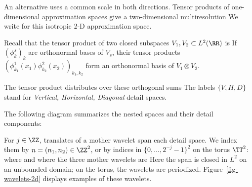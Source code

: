An alternative uses a common scale in both directions. Tensor products of one-dimensional approximation spaces give a two-dimensional multiresolution
We write
for this isotropic 2-D approximation space.

Recall that the tensor product of two closed subspaces $V_1,V_2\subset L^2(\RR)$ is
If $(\phi_k^s)_k$ are orthonormal bases of $V_s$, their tensor products $(\phi_{k_1}^1(x_1)\phi_{k_2}^2(x_2))_{k_1,k_2}$ form an orthonormal basis of $V_1 \otimes V_2$.

The tensor product distributes over these orthogonal sums
The labels $\{V,H,D\}$ stand for \textit{Vertical, Horizontal, Diagonal} detail spaces.
 
The following diagram summarizes the nested spaces and their detail components:
\begin{center}
\end{center}

For $j \in \ZZ$, translates of a mother wavelet span each detail space. We index them by $n=(n_1,n_2)\in\ZZ^2$, or by indices in $\{0,\ldots,2^{-j}-1\}^2$ on the torus $\TT^2$:
where
and where the three mother wavelets are
Here the span is closed in $L^2$ on an unbounded domain; on the torus, the wavelets are periodized. Figure~\ref{fig-wavelets-2d} displays examples of these wavelets.



